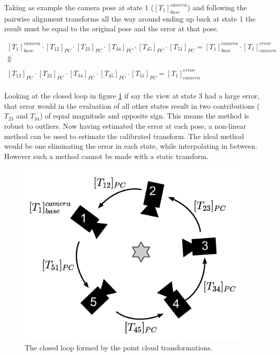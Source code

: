 \noindent Taking as example the camera pose at state 1 ($ [T_1]_{base}^{camera} $) and following the pairwise alignment transforms all the way around ending up back at state 1 the result must be equal to the original pose and the error at that pose.

\begin{equation}
\begin{matrix}
[T_{1}]_{base}^{camera} \cdot [T_{12}]_{PC} \cdot [T_{23}]_{PC} \cdot [T_{34}]_{PC} \cdot [T_{45}]_{PC} \cdot [T_{51}]_{PC} = [T_{1}]_{base}^{camera} \cdot [T_{1}]_{camera}^{error}
\\ 
\Updownarrow \\ 
\\ 
[T_{12}]_{PC} \cdot [T_{23}]_{PC} \cdot [T_{34}]_{PC} \cdot [T_{45}]_{PC} \cdot [T_{51}]_{PC} = [T_{1}]_{camera}^{error}
\end{matrix}
\end{equation}\\ 

\noindent Looking at the closed loop in figure \ref{fig:new_calibration} if say the view at state 3 had a large error, that error would in the evaluation of all other states result in two contributions ($ T_{23} $ and $ T_{34} $) of equal magnitude and opposite sign. This means the method is robust to outliers. Now having estimated the error at each pose, a non-linear method can be used to estimate the calibrated transform. The ideal method would be one eliminating the error in each state, while interpolating in between. However such a method cannot be made with a static transform.


\begin{figure}[htb]
	\begin{center}
		\includegraphics[scale=0.4,trim=0 0 0 0]{graphics/03_calibration/new_calibration.pdf}%
		\caption{The closed loop formed by the point cloud transformations.}\label{fig:new_calibration}
	\end{center}
\end{figure}


 



